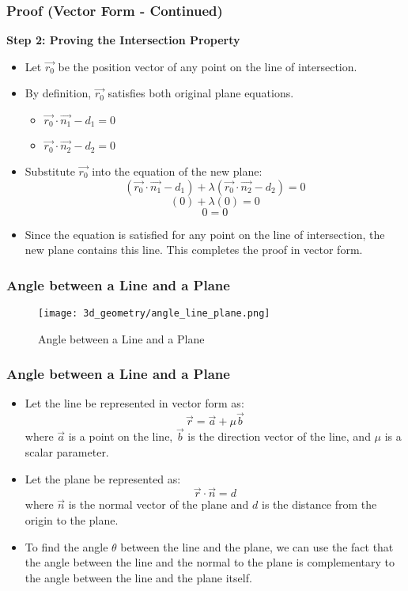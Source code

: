 \begin{frame}
    \frametitle{Proof (Vector Form - Continued)}
    \textbf{Step 2: Proving the Intersection Property}
    \begin{itemize}
        \item Let $\vec{r_0}$ be the position vector of any point on the line of intersection.
        \item By definition, $\vec{r_0}$ satisfies both original plane equations.
        \begin{itemize}
            \item $\vec{r_0} \cdot \vec{n_1} - d_1 = 0$
            \item $\vec{r_0} \cdot \vec{n_2} - d_2 = 0$
        \end{itemize}
        \item Substitute $\vec{r_0}$ into the equation of the new plane:
        \[(\vec{r_0} \cdot \vec{n_1} - d_1) + \lambda(\vec{r_0} \cdot \vec{n_2} - d_2) = 0\]
        \[(0) + \lambda(0) = 0\]
        \[0 = 0\]
        \item Since the equation is satisfied for any point on the line of intersection, the new plane contains this line. This completes the proof in vector form.
    \end{itemize}
\end{frame}

\begin{frame}
    \frametitle{Angle between a Line and a Plane}
    \begin{figure}
        \texttt{[image: 3d\_geometry/angle\_line\_plane.png]}
        \caption{Angle between a Line and a Plane}
    \end{figure}
\end{frame}

\begin{frame}
\frametitle{Angle between a Line and a Plane}
\begin{itemize}
    \item Let the line be represented in vector form as:
    \[\vec{r} = \vec{a} + \mu \vec{b}\]
    where $\vec{a}$ is a point on the line, $\vec{b}$ is the direction vector of the line, and $\mu$ is a scalar parameter.
    \item Let the plane be represented as:
    \[\vec{r} \cdot \vec{n} = d\]
    where $\vec{n}$ is the normal vector of the plane and $d$ is the distance from the origin to the plane.
    \item To find the angle $\theta$ between the line and the plane, we can use the fact that the angle between the line and the normal to the plane is complementary to the angle between the line and the plane itself.
\end{itemize}                       
\end{frame}
